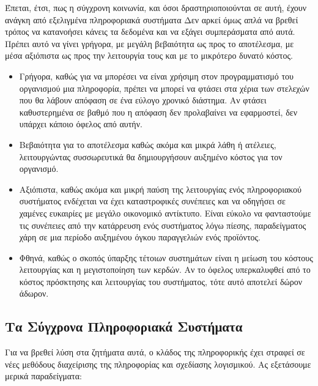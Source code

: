 \documentclass{article}
\begin{document}
Έπεται, έτσι, πως η σύγχρονη κοινωνία, και όσοι δραστηριοποιούνται σε αυτή, έχουν ανάγκη από εξελιγμένα πληροφοριακά συστήματα
Δεν αρκεί όμως απλά  να βρεθεί τρόπος να κατανοήσει κάνεις τα δεδομένα και να εξάγει συμπεράσματα από αυτά. Πρέπει αυτό να γίνει γρήγορα, με μεγάλη βεβαιότητα ως προς το αποτέλεσμα, με μέσα αξιόπιστα ως προς την λειτουργία τους και με το μικρότερο δυνατό κόστος.


\begin{itemize}
\item Γρήγορα, καθώς για να μπορέσει να είναι χρήσιμη στον προγραμματισμό του οργανισμού μια πληροφορία, πρέπει να μπορεί να φτάσει στα χέρια των στελεχών που θα λάβουν απόφαση σε ένα εύλογο χρονικό διάστημα. Αν φτάσει καθυστερημένα σε βαθμό που η απόφαση δεν προλαβαίνει να εφαρμοστεί, δεν υπάρχει κάποιο όφελος από αυτήν.
\item Βεβαιότητα για το αποτέλεσμα καθώς ακόμα και μικρά λάθη ή ατέλειες, λειτουργώντας συσσωρευτικά θα δημιουργήσουν αυξημένο κόστος για τον οργανισμό.
\item Αξιόπιστα, καθώς ακόμα και μικρή παύση της λειτουργίας ενός πληροφοριακού συστήματος ενδέχεται να έχει καταστροφικές συνέπειες και να οδηγήσει σε χαμένες ευκαιρίες με μεγάλο οικονομικό αντίκτυπο. Είναι εύκολο να φανταστούμε τις συνέπειες από την κατάρρευση ενός συστήματος λόγω πίεσης, παραδείγματος χάρη σε μια περίοδο αυξημένου όγκου παραγγελιών ενός προϊόντος.
\item Φθηνά, καθώς ο σκοπός ύπαρξης τέτοιων συστημάτων είναι η μείωση του κόστους λειτουργίας και η μεγιστοποίηση των κερδών. Αν το όφελος υπερκαλυφθεί από το κόστος πρόσκτησης και λειτουργίας του συστήματος, τότε αυτό αποτελεί δώρον άδωρον.
\end{itemize}

\subsection{Τα Σύγχρονα Πληροφοριακά Συστήματα}
Για να βρεθεί λύση στα ζητήματα αυτά, ο κλάδος της πληροφορικής έχει στραφεί σε νέες  μεθόδους διαχείρισης της πληροφορίας και σχεδίασης λογισμικού. Ας εξετάσουμε μερικά παραδείγματα:
\end{document}
